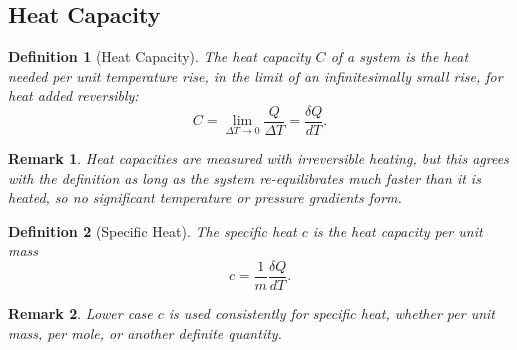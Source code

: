 \documentclass{article}
\newtheorem{definition}{Definition}
\newtheorem{remark}{Remark}
\begin{document}
\subsection{Heat Capacity}
\begin{definition}[Heat Capacity]
    The heat capacity $C$ of a system is the heat needed per unit temperature rise, in the limit of an infinitesimally small rise, for heat added reversibly:
    \begin{equation}
        \label{eq:heat-capacity}
        C = \lim_{\Delta T \to 0}\frac{Q}{\Delta T} = \frac{\delta Q}{dT}.
    \end{equation}
\end{definition}
\begin{remark}
    Heat capacities are measured with irreversible heating, but this agrees with the definition as long as the system re-equilibrates much faster than it is heated, so no significant temperature or pressure gradients form.
\end{remark}
\begin{definition}[Specific Heat]
    The specific heat $c$ is the heat capacity per unit mass
    \begin{equation}
        \label{eq:specific-heat}
        c = \frac{1}{m}\frac{\delta Q}{dT}.
    \end{equation}
\end{definition}
\begin{remark}
    Lower case $c$ is used consistently for specific heat, whether per unit mass, per mole, or another definite quantity.
\end{remark}
\end{document}
